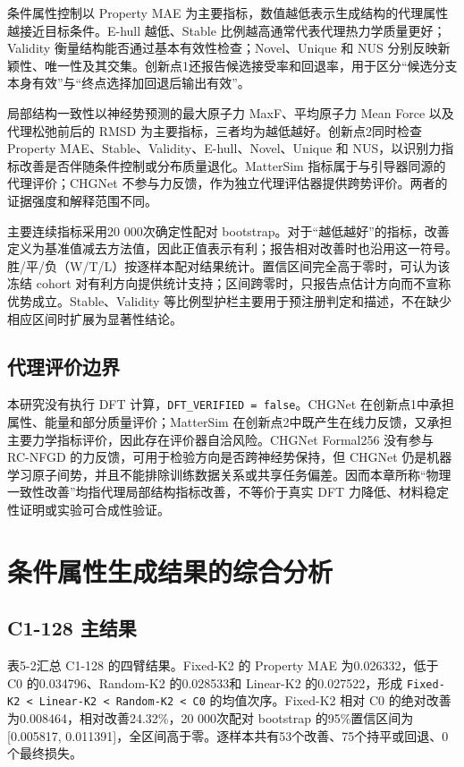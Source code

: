 条件属性控制以 Property MAE 为主要指标，数值越低表示生成结构的代理属性越接近目标条件。E-hull 越低、Stable 比例越高通常代表代理热力学质量更好；Validity 衡量结构能否通过基本有效性检查；Novel、Unique 和 NUS 分别反映新颖性、唯一性及其交集。创新点1还报告候选接受率和回退率，用于区分``候选分支本身有效''与``终点选择加回退后输出有效''。

局部结构一致性以神经势预测的最大原子力 MaxF、平均原子力 Mean Force 以及代理松弛前后的 RMSD 为主要指标，三者均为越低越好。创新点2同时检查 Property MAE、Stable、Validity、E-hull、Novel、Unique 和 NUS，以识别力指标改善是否伴随条件控制或分布质量退化。Matter\allowbreak Sim 指标属于与引导器同源的代理评价；CHGNet 不参与力反馈，作为独立代理评估器提供跨势评价。两者的证据强度和解释范围不同。

主要连续指标采用20 000次确定性配对 bootstrap。对于``越低越好''的指标，改善定义为基准值减去方法值，因此正值表示有利；报告相对改善时也沿用这一符号。胜/平/负（W/T/L）按逐样本配对结果统计。置信区间完全高于零时，可认为该冻结 cohort 对有利方向提供统计支持；区间跨零时，只报告点估计方向而不宣称优势成立。Stable、Validity 等比例型护栏主要用于预注册判定和描述，不在缺少相应区间时扩展为显著性结论。

\subsection{代理评价边界}

本研究没有执行 DFT 计算，\texttt{DFT\_VERIFIED\ =\ false}。CHGNet 在创新点1中承担属性、能量和部分质量评价；Matter\allowbreak Sim 在创新点2中既产生在线力反馈，又承担主要力学指标评价，因此存在评价器自洽风险。CHGNet Formal256 没有参与 RC-NFGD 的力反馈，可用于检验方向是否跨神经势保持，但 CHGNet 仍是机器学习原子间势，并且不能排除训练数据关系或共享任务偏差。因而本章所称``物理一致性改善''均指代理局部结构指标改善，不等价于真实 DFT 力降低、材料稳定性证明或实验可合成性验证。

\section{条件属性生成结果的综合分析}

\subsection{C1-128 主结果}

表5-2汇总 C1-128 的四臂结果。Fixed-K2 的 Property MAE 为0.026332，低于 C0 的0.034796、Random-\allowbreak K2 的0.028533和 Linear-K2 的0.027522，形成 \texttt{Fixed-K2\ \textless{}\ Linear-K2\ \textless{}\ Random-\allowbreak K2\ \textless{}\ C0} 的均值次序。Fixed-K2 相对 C0 的绝对改善为0.008464，相对改善24.32\%，20 000次配对 bootstrap 的95\%置信区间为{[}0.005817, 0.011391{]}，全区间高于零。逐样本共有53个改善、75个持平或回退、0个最终损失。


